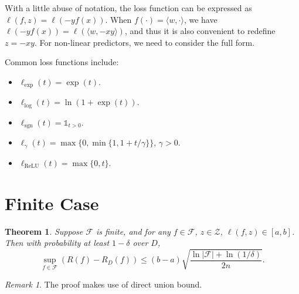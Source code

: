 \documentclass[openany]{book}
\newtheorem{theorem}{Theorem}[chapter]
\theoremstyle{definition}
\theoremstyle{remark}
\newtheorem*{remark}{Remark}
\begin{document}
With a little abuse of notation, the loss function can be expressed as $\ell(f,z)=\ell\left(-yf(x)\right)$. When $f(\cdot)=\langle w,\cdot\rangle$, we have $\ell(-yf(x))=\ell\left(\langle w,-xy\rangle\right)$, and thus it is also convenient to redefine $z=-xy$. For non-linear predictors, we need to consider the full form.

Common loss functions include:
\begin{itemize}
    \item $\ell_{\mathrm{exp}}(t)=\exp(t)$.
    \item $\ell_{\mathrm{log}}(t)=\ln\left(1+\exp(t)\right)$.
    \item $\ell_{\mathrm{sgn}}(t)=\mathds{1}_{t>0}$.
    \item $\ell_{\gamma}(t)=\max\{0,\min\{1,1+t/\gamma\}\}$, $\gamma>0$.
    \item $\ell_{\mathrm{ReLU}}(t)=\max\{0,t\}$.
\end{itemize}

\section{Finite Case}
\begin{theorem}
    Suppose $\mathcal{F}$ is finite, and for any $f\in \mathcal{F}$, $z\in \mathcal{Z}$, $\ell(f,z)\in[a,b]$. Then with probability at least $1-\delta$ over $D$,
    \begin{equation*}
        \sup_{f\in \mathcal{F}}\left(R(f)-R_{D}(f)\right)\le(b-a)\sqrt{\frac{\ln|\mathcal{F}|+\ln(1/\delta)}{2n}}.
    \end{equation*}
\end{theorem}
\begin{remark}
    The proof makes use of direct union bound.
\end{remark}
\end{document}

